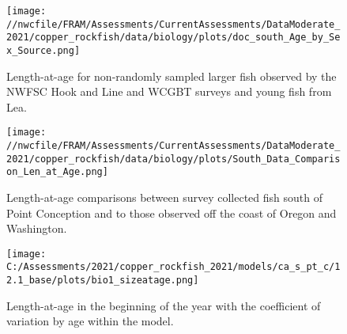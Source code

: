 \documentclass[11pt,
  english,
  a4paper,
]{article}
\begin{document}
\tagmcend\tagstructend


\begin{figure}
\centering
\texttt{[image: //nwcfile/FRAM/Assessments/CurrentAssessments/DataModerate\_2021/copper\_rockfish/data/biology/plots/doc\_south\_Age\_by\_Sex\_Source.png]}
\caption{Length-at-age for non-randomly sampled larger fish observed by the NWFSC Hook and Line and WCGBT surveys and young fish from Lea.\label{fig:south-len-at-age-data}}
\end{figure}

\tagmcend\tagstructend


\begin{figure}
\centering
\texttt{[image: //nwcfile/FRAM/Assessments/CurrentAssessments/DataModerate\_2021/copper\_rockfish/data/biology/plots/South\_Data\_Comparison\_Len\_at\_Age.png]}
\caption{Length-at-age comparisons between survey collected fish south of Point Conception and to those observed off the coast of Oregon and Washington.\label{fig:len-at-age-comp}}
\end{figure}

\tagmcend\tagstructend

\clearpage


\begin{figure}
\centering
\texttt{[image: C:/Assessments/2021/copper\_rockfish\_2021/models/ca\_s\_pt\_c/12.1\_base/plots/bio1\_sizeatage.png]}
\caption{Length-at-age in the beginning of the year with the coefficient of variation by age within the model.\label{fig:len-age-ss}}
\end{figure}

\tagmcend\tagstructend

\end{document}
